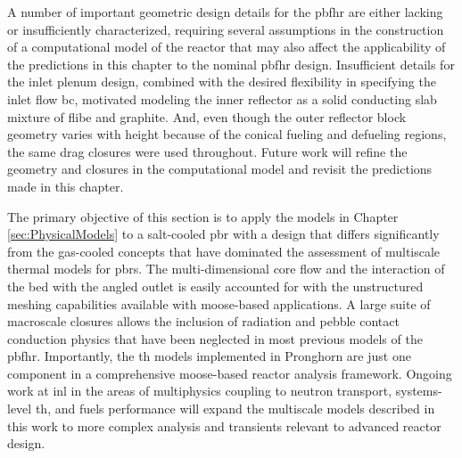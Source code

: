 A number of important geometric design details for the \gls{pbfhr} are either lacking or insufficiently characterized, requiring several assumptions in the construction of a computational model of the reactor that may also affect the applicability of the predictions in this chapter to the nominal \gls{pbfhr} design. Insufficient details for the inlet plenum design, combined with the desired flexibility in specifying the inlet flow \gls{bc}, motivated modeling the inner reflector as a solid conducting slab mixture of \gls{flibe} and graphite. And, even though the outer reflector block geometry varies with height because of the conical fueling and defueling regions, the same drag closures were used throughout. Future work will refine the geometry and closures in the computational model and revisit the predictions made in this chapter.

The primary objective of this section is to apply the models in Chapter \ref{sec:PhysicalModels} to a salt-cooled \gls{pbr} with a design that differs significantly from the gas-cooled concepts that have dominated the assessment of multiscale thermal models for \glspl{pbr}. The multi-dimensional core flow and the interaction of the bed with the angled outlet is easily accounted for with the unstructured meshing capabilities available with \gls{moose}-based applications. A large suite of macroscale closures allows the inclusion of radiation and pebble contact conduction physics that have been neglected in most previous models of the \gls{pbfhr}. Importantly, the \gls{th} models implemented in Pronghorn are just one component in a comprehensive \gls{moose}-based reactor analysis framework. Ongoing work at \gls{inl} in the areas  of multiphysics coupling to neutron transport, systems-level \gls{th}, and fuels performance will expand the multiscale models described in this work to more complex analysis and transients relevant to advanced reactor design.
